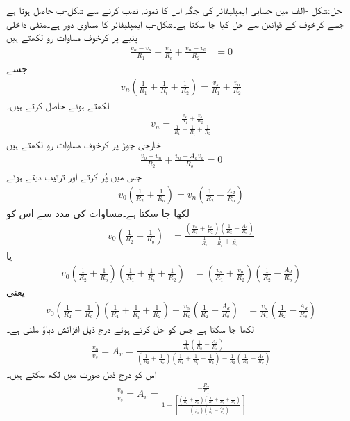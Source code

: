 حل:شکل -الف میں حسابی ایمپلیفائر کی جگہ اس کا نمونہ نصب کرنے سے شکل-ب حاصل ہوتا ہے جسے کرخوف کے قوانین سے حل کیا جا سکتا ہے۔شکل-ب  ایمپلیفائر کا مساوی دور ہے۔منفی داخلی پنیے  پر کرخوف مساوات رو لکھتے ہیں
\begin{align*}
\frac{v_n-v_s}{R_1}+\frac{v_n}{R_i}+\frac{v_n-v_0}{R_2}&=0
\end{align*}
جسے
\begin{align*}
v_n\left(\frac{1}{R_1}+\frac{1}{R_i}+\frac{1}{R_2}\right)=\frac{v_s}{R_1}+\frac{v_o}{R_2}
\end{align*}
لکھتے ہوئے  حاصل کرتے ہیں۔
\begin{align}\label{مساوات_حسابی_منفی_پنیا_الف}
v_n=\frac{\frac{v_s}{R_1}+\frac{v_o}{R_2}}{\frac{1}{R_1}+\frac{1}{R_i}+\frac{1}{R_2}}
\end{align}
خارجی جوڑ پر کرخوف مساوات رو لکھتے ہیں
\begin{align*}
\frac{v_0-v_n}{R_2}+\frac{v_0-A_d v_d}{R_o}=0
\end{align*}
جس میں  پُر کرتے اور ترتیب دیتے ہوئے
\begin{align*}
v_0\left(\frac{1}{R_2}+\frac{1}{R_o}\right)=v_n\left(\frac{1}{R_2}-\frac{A_d}{R_o}\right)
\end{align*}
لکھا جا سکتا ہے۔مساوات  کی مدد سے اس کو
\begin{align*}
v_0\left(\frac{1}{R_2}+\frac{1}{R_o}\right)&=\frac{\left(\frac{v_s}{R_1}+\frac{v_o}{R_2}\right)\left(\frac{1}{R_2}-\frac{A_d}{R_o}\right)}{\frac{1}{R_1}+\frac{1}{R_i}+\frac{1}{R_2}}
\end{align*}
یا
\begin{align*}
v_0\left(\frac{1}{R_2}+\frac{1}{R_o}\right)\left(\frac{1}{R_1}+\frac{1}{R_i}+\frac{1}{R_2}\right)&=\left(\frac{v_s}{R_1}+\frac{v_o}{R_2}\right)\left(\frac{1}{R_2}-\frac{A_d}{R_o}\right)
\end{align*}
یعنی
\begin{align*}
v_0\left(\frac{1}{R_2}+\frac{1}{R_o}\right)\left(\frac{1}{R_1}+\frac{1}{R_i}+\frac{1}{R_2}\right)-\frac{v_0}{R_o}\left(\frac{1}{R_2}-\frac{A_d}{R_o}\right)&=\frac{v_s}{R_1}\left(\frac{1}{R_2}-\frac{A_d}{R_o}\right)
\end{align*}
لکھا جا سکتا ہے جس کو حل کرتے ہوئے درج ذیل افزائش دباؤ  ملتی ہے۔
\begin{align*}
\frac{v_0}{v_s}=A_v=\frac{\frac{1}{R_1} \left(\frac{1}{R_2}-\frac{A_d}{R_o}\right)}{\left(\frac{1}{R_2}+\frac{1}{R_o}\right)\left(\frac{1}{R_1}+\frac{1}{R_i}+\frac{1}{R_2}\right)-\frac{1}{R_2}\left(\frac{1}{R_2}-\frac{A_d}{R_o}\right)}
\end{align*}
اس کو درج ذیل صورت میں لکھ سکتے ہیں۔
\begin{align}\label{مساوات_حسابی_منفی_الف}
\frac{v_0}{v_s}=A_v=\frac{-\frac{R_2}{R_1}}{1-\left[\frac{\left(\frac{1}{R_2}+\frac{1}{R_o}\right)\left(\frac{1}{R_1}+\frac{1}{R_i}+\frac{1}{R_2}\right)}{\left(\frac{1}{R_2}\right)\left(\frac{1}{R_2}-\frac{A_d}{R_o}\right)}\right]}
\end{align}


